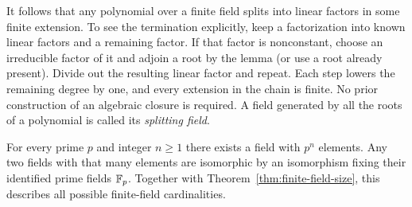 It follows that any polynomial over a finite field splits into linear
factors in some finite extension. To see the termination explicitly,
keep a factorization into known linear factors and a remaining factor.
If that factor is nonconstant, choose an irreducible factor of it and
adjoin a root by the lemma (or use a root already present). Divide out
the resulting linear factor and repeat. Each step lowers the remaining
degree by one, and every extension in the chain is finite. No prior
construction of an algebraic closure is required. A field generated by
all the roots of a polynomial is called its \emph{splitting field}.

\begin{theorem}
\label{thm:galois-field-uniqueness}
For every prime $p$ and integer $n\ge1$ there exists a field with
$p^n$ elements. Any two fields with that many elements are isomorphic
by an isomorphism fixing their identified prime fields $\mathbb F_p$.
Together with Theorem~\ref{thm:finite-field-size}, this describes all
possible finite-field cardinalities.
\end{theorem}
